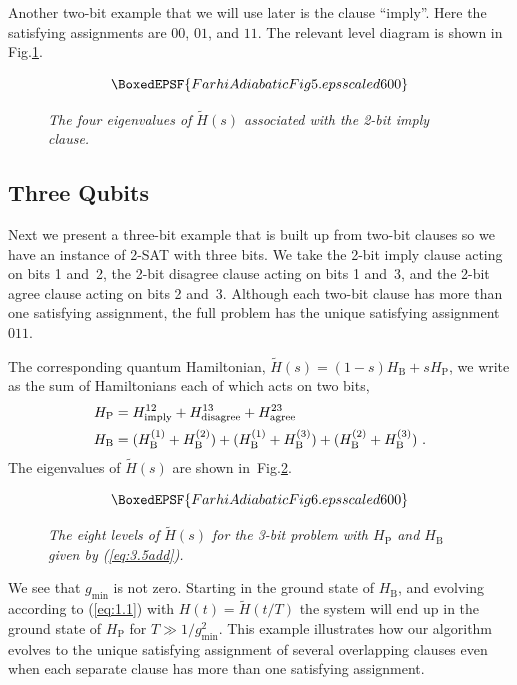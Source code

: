 \documentclass[twoside]{article}
\newcommand{\refEq}[1]{(\ref{eq:#1})}
\newcommand{\numFig}[3]{\begin{figure}[ht]
 $$\BoxedEPSF{#3}$$
    \caption{#2}\label{fig:#1}
   \end{figure}}
\newcommand{\refFig}[1]{Fig.\thinspace\ref{fig:#1}}
\newcommand{\rP}{{\mathrm{P}}}
\newcommand{\rB}{{\mathrm{B}}}
\newcommand{\gm}{g_{\min}}
\let\tilde\widetilde
\numberwithin{equation}{section}
\begin{document}
Another two-bit example that we will use later is the clause ``imply''.  Here
the satisfying assignments are $00$, $01$, and $11$. The relevant level
diagram is shown in \refFig{5}. 
\numFig{5}{\slshape  The four eigenvalues of $\tilde H(s)$ associated with
the 2-bit imply clause.}{FarhiAdiabaticFig5.eps scaled 600}

\subsection{Three Qubits} Next we present a three-bit example that is built
up from two-bit clauses so we have an instance of 2-SAT with three bits.
We  take the 2-bit imply clause acting on bits 1 and~2, the 2-bit disagree
clause acting on bits 1 and~3, and the 2-bit agree clause acting on bits 2
and~3.  Although each two-bit clause has more than one satisfying
assignment, the full problem has the unique satisfying assignment~$011$. 

The corresponding quantum Hamiltonian, $\tilde H(s)=(1-s)H_\rB + s
H_\rP$,  we write as the sum of Hamiltonians each of which acts on two
bits, 
\begin{align} H_\rP &= H_{\rm imply}^{12} + H_{\rm disagree}^{13} +
H_{\rm agree}^{23}\nonumber\\[.25ex]
 H_\rB &= (H_\rB^{(1)} + H_\rB^{(2)}) + 
(H_\rB^{(1)} + H_\rB^{(3)}) +  (H_\rB^{(2)} + H_\rB^{(3)})
\ .\label{eq:3.5add}
\end{align} The eigenvalues of $\tilde H(s)$ are shown in~\refFig{6}.
\numFig{6}{\slshape  The eight levels of $\tilde H(s)$ for the 3-bit problem
with $H_\rP$ and  $H_\rB$ given by
\protect\refEq{3.5add}.}{FarhiAdiabaticFig6.eps scaled 600}  We see that
$\gm$ is not zero. Starting in the ground state of $H_\rB$, and evolving
according to \refEq{1.1} with
$H(t) = \tilde H(t/T)$ the system will end up in the ground state of
$H_\rP$ for $T\gg 1/\gm^2$. This example illustrates how our algorithm
evolves to the unique satisfying assignment of several overlapping clauses
even when each separate clause has more than one satisfying assignment.
\end{document}
